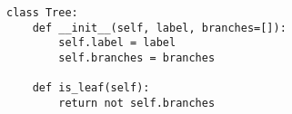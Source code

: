 \begin{lstlisting}
class Tree:
    def __init__(self, label, branches=[]):
        self.label = label
        self.branches = branches

    def is_leaf(self):
        return not self.branches
\end{lstlisting}

